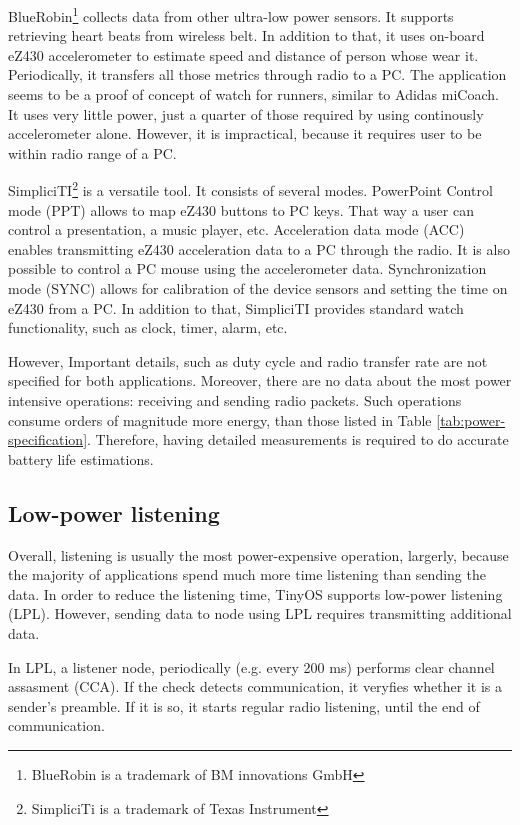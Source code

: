 BlueRobin\footnote{BlueRobin is a trademark of BM innovations GmbH} collects data from other ultra-low power sensors.
It supports retrieving heart beats from wireless belt.
In addition to that, it uses on-board eZ430 accelerometer to estimate speed and distance of person whose wear it.
Periodically, it transfers all those metrics through radio to a PC.
The application seems to be a proof of concept of watch for runners, similar to Adidas miCoach. 
It uses very little power, just a quarter of those required by using continously accelerometer alone.
However, it is impractical, because it requires user to be within radio range of a PC.

SimpliciTI\footnote{SimpliciTi is a trademark of Texas Instrument} is a versatile tool.
It consists of several modes.
PowerPoint Control mode (PPT) allows to map eZ430 buttons to PC keys.
That way a user can control a presentation, a music player, etc.
Acceleration data mode (ACC) enables transmitting eZ430 acceleration data to a PC through the radio.
It is also possible to control a PC mouse using the accelerometer data.
Synchronization mode (SYNC) allows for calibration of the device sensors and setting the time on eZ430 from a PC.
In addition to that, SimpliciTI provides standard watch functionality, such as clock, timer, alarm, etc. 

However, Important details, such as duty cycle and radio transfer rate are not specified for both applications.
Moreover, there are no data about the most power intensive operations: receiving and sending radio packets.
Such operations consume orders of magnitude more energy, than those listed in Table \ref{tab:power-specification}.
Therefore, having detailed measurements is required to do accurate battery life estimations.

\subsection{Low-power listening}
Overall, listening is usually the most power-expensive operation, largerly, because the majority of applications spend much more time listening than sending the data.
In order to reduce the listening time, TinyOS supports low-power listening (LPL).
However, sending data to node using LPL requires transmitting additional data.

In LPL, a listener node, periodically (e.g. every 200 ms) performs clear channel assasment (CCA).
If the check detects communication, it veryfies whether it is a sender's preamble.
If it is so, it starts regular radio listening, until the end of communication.


